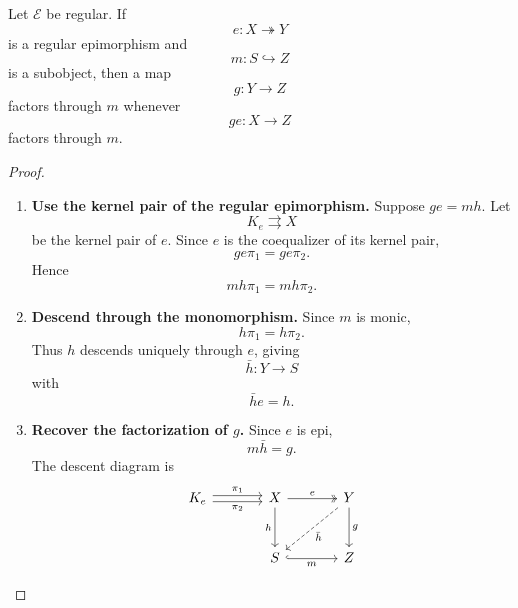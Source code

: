\begin{lemma}
\label{lem:regular-epi-descent-subobjects}
    Let \(\mathcal E\) be regular. If
    \[
        e:X\twoheadrightarrow Y
    \]
    is a regular epimorphism and
    \[
        m:S\hookrightarrow Z
    \]
    is a subobject, then a map
    \[
        g:Y\to Z
    \]
    factors through \(m\) whenever
    \[
        ge:X\to Z
    \]
    factors through \(m\).
\end{lemma}
\begin{proof}
    \leavevmode
    \begin{enumerate}
        \item \textbf{Use the kernel pair of the regular epimorphism.} Suppose \(ge=mh\). Let
        \[
            K_e\rightrightarrows X
        \]
        be the kernel pair of \(e\). Since \(e\) is the coequalizer of its kernel pair,
        \[
            ge\pi_1=ge\pi_2.
        \]
        Hence
        \[
            mh\pi_1=mh\pi_2.
        \]

        \item \textbf{Descend through the monomorphism.} Since \(m\) is monic,
        \[
            h\pi_1=h\pi_2.
        \]
        Thus \(h\) descends uniquely through \(e\), giving
        \[
            \bar h:Y\to S
        \]
        with
        \[
            \bar h e=h.
        \]

        \item \textbf{Recover the factorization of \(g\).} Since \(e\) is epi,
        \[
            m\bar h=g.
        \]
        The descent diagram is
        \[
            \begin{tikzcd}[column sep=large, row sep=large]
                    K_e
                        \arrow[r, shift left=0.5ex, "\pi_1"]
                        \arrow[r, shift right=0.5ex, "\pi_2"']
                &
                    X
                        \arrow[r, two heads, "e"]
                        \arrow[d, "h"']
                &
                    Y
                        \arrow[dl, dashed, "\bar h"]
                        \arrow[d, "g"]
                \\
                &
                    S
                        \arrow[r, hook, "m"']
                &
                    Z
            \end{tikzcd}
        \]
    \end{enumerate}
\end{proof}

